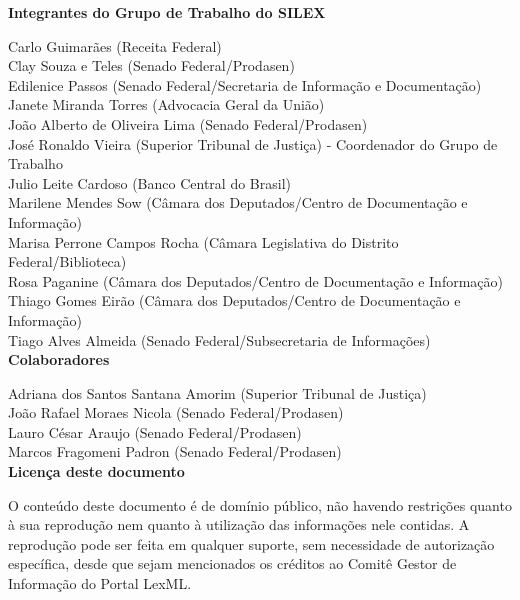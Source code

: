 \documentclass[a4paper,11pt,openright,twoside,brazil]{abntex2}
\begin{document}
\frenchspacing 



\imprimircapa

\imprimirfolhaderosto*

\vspace*{\fill}
{
\setlength{\parindent}{0cm}

\ABNTEXchapterfont

\textbf{Integrantes do Grupo de Trabalho do SILEX} 

Carlo Guimarães (Receita Federal) \\
Clay Souza e Teles (Senado Federal/Prodasen) \\
Edilenice Passos (Senado Federal/Secretaria de Informação e Documentação) \\
Janete Miranda Torres (Advocacia Geral da União) \\
João Alberto de Oliveira Lima (Senado Federal/Prodasen) \\
José Ronaldo Vieira (Superior Tribunal de Justiça) - Coordenador do Grupo de
Trabalho \\
Julio Leite Cardoso (Banco Central do Brasil) \\
Marilene Mendes Sow (Câmara dos Deputados/Centro de Documentação e Informação)
\\
Marisa Perrone Campos Rocha (Câmara Legislativa do Distrito Federal/Biblioteca)
\\
Rosa Paganine (Câmara dos Deputados/Centro de Documentação e Informação) \\
Thiago Gomes Eirão (Câmara dos Deputados/Centro de Documentação e Informação) \\
Tiago Alves Almeida (Senado Federal/Subsecretaria de Informações) \\

\textbf{Colaboradores}

Adriana dos Santos Santana Amorim (Superior Tribunal de Justiça) \\
João Rafael Moraes Nicola (Senado Federal/Prodasen) \\
Lauro César Araujo (Senado Federal/Prodasen) \\
Marcos Fragomeni Padron (Senado Federal/Prodasen) \\

\textbf{Licença deste documento}

O conteúdo deste documento é de domínio público, não havendo restrições quanto à sua
reprodução nem quanto à utilização das informações nele contidas. A reprodução pode ser feita
em qualquer suporte, sem necessidade de autorização específica, desde que sejam mencionados
os créditos ao Comitê Gestor de Informação do Portal LexML. 
}
\vspace*{\fill}
\end{document}
